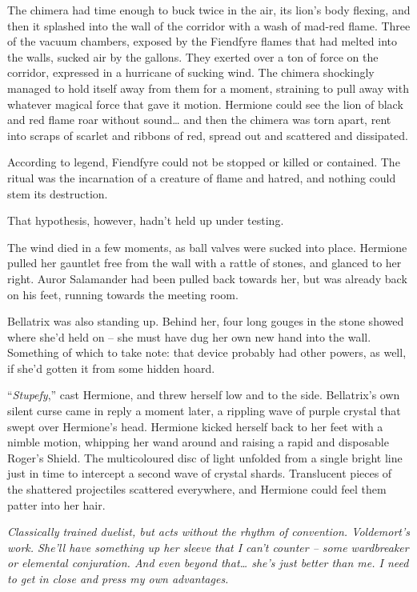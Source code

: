The chimera had time enough to buck twice in the air, its lion's body
flexing, and then it splashed into the wall of the corridor with a wash
of mad-red flame. Three of the vacuum chambers, exposed by the Fiendfyre
flames that had melted into the walls, sucked air by the gallons. They
exerted over a ton of force on the corridor, expressed in a hurricane of
sucking wind. The chimera shockingly managed to hold itself away from
them for a moment, straining to pull away with whatever magical force
that gave it motion. Hermione could see the lion of black and red flame
roar without sound\ldots{} and then the chimera was torn apart, rent
into scraps of scarlet and ribbons of red, spread out and scattered and
dissipated.

According to legend, Fiendfyre could not be stopped or killed or
contained. The ritual was the incarnation of a creature of flame and
hatred, and nothing could stem its destruction.

That hypothesis, however, hadn't held up under testing.

The wind died in a few moments, as ball valves were sucked into place.
Hermione pulled her gauntlet free from the wall with a rattle of stones,
and glanced to her right. Auror Salamander had been pulled back towards
her, but was already back on his feet, running towards the meeting room.

Bellatrix was also standing up. Behind her, four long gouges in the
stone showed where she'd held on -- she must have dug her own new hand
into the wall. Something of which to take note: that device probably had
other powers, as well, if she'd gotten it from some hidden hoard.

``\emph{Stupefy},'' cast Hermione, and threw herself low and to the
side. Bellatrix's own silent curse came in reply a moment later, a
rippling wave of purple crystal that swept over Hermione's head.
Hermione kicked herself back to her feet with a nimble motion, whipping
her wand around and raising a rapid and disposable Roger's Shield. The
multicoloured disc of light unfolded from a single bright line just in
time to intercept a second wave of crystal shards. Translucent pieces of
the shattered projectiles scattered everywhere, and Hermione could feel
them patter into her hair.

\emph{Classically trained duelist, but acts without the rhythm of
convention. Voldemort's work. She'll have something up her sleeve that I
can't counter -- some wardbreaker or elemental conjuration. And even
beyond that\ldots{} she's just better than me. I need to get in close
and press my own advantages.}

